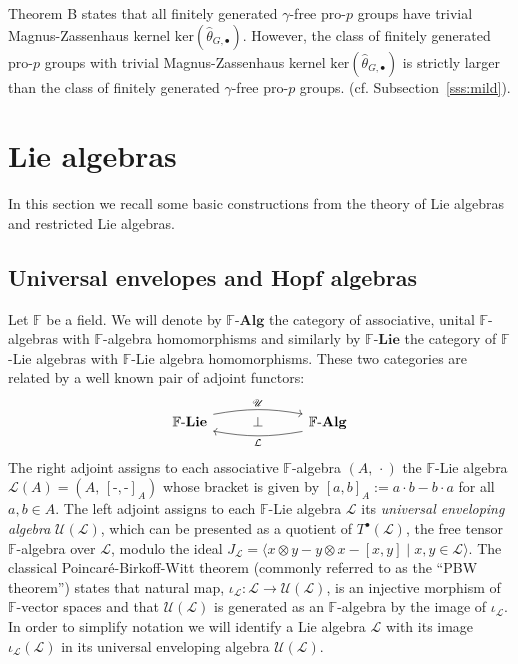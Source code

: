\documentclass{amsart}
\theoremstyle{plain}
\theoremstyle{definition}
\numberwithin{theorem}{section}
\numberwithin{equation}{section}
\newcommand{\LL}{\mathscr{L}}
\newcommand{\Univ}{\mathscr{U}}
\newcommand{\catlie}{\mathbf{Lie}}
\newcommand{\catAlg}{\mathbf{Alg}}
\newcommand{\FF}{\mathbb{F}}
\newcommand{\kernel}{\mathrm{ker}}
\begin{document}
Theorem B states that all finitely generated $\gamma$-free pro-$p$ groups have trivial Magnus-Zassenhaus kernel $\kernel(\hat{\theta}_{G,\bullet})$. However, the class of 
finitely generated pro-$p$ groups with trivial Magnus-Zassenhaus kernel $\kernel(\hat{\theta}_{G,\bullet})$ is strictly larger than the class of finitely generated $\gamma$-free pro-$p$ groups. (cf. Subsection~\ref{sss:mild}).



\section{Lie algebras}
\label{s:Liealg}
In this section we recall some basic constructions from the theory of Lie algebras and restricted Lie algebras.

\subsection{Universal envelopes and Hopf algebras}
\label{ss:UniHopf}
Let $\FF$ be a field. We will denote by $\FF\text{-}\catAlg$ the category of associative, unital $\FF$-algebras with $\FF$-algebra homomorphisms and similarly by $\FF\text{-}\catlie$ the category of $\FF$-Lie algebras with $\FF$-Lie algebra homomorphisms. These two categories are related by a well known pair of adjoint functors:
\begin{equation}\begin{tikzcd}
    \FF\text{-}\catlie \arrow[rr, yshift=3pt, bend left=10pt, "\Univ"] &  {\bot} & \FF\text{-}\catAlg \arrow[ll, yshift=-3pt, bend left=10pt, "\mathcal L" below]
\end{tikzcd}\end{equation}
The right adjoint assigns to each associative $\FF$-algebra $(A,\, \cdot)$ the $\FF$-Lie algebra ${\mathcal L}(A) = (A,\, [\text{-},\text{-}]_A)$ whose bracket is given by $[a, b]_A := a\cdot b - b \cdot a$ for all $a, b \in A$. The left adjoint assigns to each $\FF$-Lie algebra $\LL$ its \emph{universal enveloping algebra} $\Univ(\LL)$,
which can be presented as a quotient of $T^\bullet(\LL)$, the free tensor $\FF$-algebra over $\LL$, modulo the ideal $J_\LL = \langle x \otimes y - y \otimes x - [x, y] \mid x, y \in \LL \rangle$. The classical Poincar\'e-Birkoff-Witt theorem (commonly referred to as the ``PBW theorem'') states that natural map, $\iota_\LL : \LL \to \Univ(\LL)$, is an injective morphism of $\FF$-vector spaces and that $\Univ(\LL)$ is generated as an $\FF$-algebra by the image of $\iota_\LL$. In order to simplify notation we will identify a Lie algebra $\LL$ with its image $\iota_\LL(\LL)$ in its universal enveloping algebra $\Univ(\LL)$.
\end{document}
